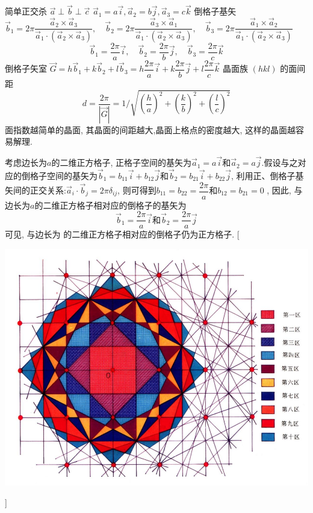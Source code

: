 \documentclass[UTF8,12pt, a4paper, oneside]{ctexart}
\begin{document}
        {简单正交杀 $\vec{a} \perp \vec{b} \perp \vec{c}$ $ \vec{a}_{1}=a\vec{i}, \vec{a}_{2}=b \vec{j}, \vec{a}_3=c\vec{k}$
        倒格子基矢 $\vec{b}_{1}=2 \pi \dfrac{\vec{a}_{2} \times \vec{a}_{3}}{\vec{a}_{1} \cdot (\vec{a}_{2} \times \vec{a}_{3})}, \quad \vec{b}_{2}=2 \pi \dfrac{\vec{a}_{3} \times \vec{a}_{1}}{\vec{a}_{1} \cdot(\vec{a}_{2} \times \vec{a}_{3})}, \quad \vec{b}_{3}=2 \pi \dfrac{\vec{a}_{1} \times \vec{a}_{2}}{\vec{a}_{1} \cdot (\vec{a}_{2} \times \vec{a}_{3})}$
        $$
        \vec{b}_{1}=\dfrac{2 \pi}{a} \vec{i}, \quad \vec{b}_{2}=\dfrac{2 \pi}{b} \vec{j}, \quad \vec{b}_{3}=\dfrac{2 \pi}{c} \vec{k}
        $$
        倒格子矢室 $\vec{G}=h \vec{b}_{1}+k \vec{b}_{2}+l \vec{b}_{3}=h \dfrac{2 \pi}{a} \vec{i}+k \dfrac{2 \pi}{b} \vec{j}+l \dfrac{2 \pi}{c} \vec{k}$ 晶面族  $(hkl)$ 的面间距
        $$
        d=\dfrac{2 \pi}{|\vec{G}|}=1 / \sqrt{(\dfrac{h}{a})^{2}+(\dfrac{k}{b})^{2}+(\dfrac{l}{c})^{2}}
        $$ 面指数越简单的晶面, 其晶面的间距越大,晶面上格点的密度越大, 这样的晶面越容易解理.}

    {考虑边长为$a$的二维正方格子, 正格子空间的基矢为$\vec{a}_1=a\vec{i}$和$\vec{a}_2=a\vec{j}$.假设与之对应的倒格子空间的基矢为$\vec{b}_1=b_{11}\vec{i}+b_{12}\vec{j}$和$\vec{b}_2=b_{21}\vec{i}+b_{22}\vec{j}$, 利用正、倒格子基矢间的正交关系:$\vec{a}_i \cdot \vec{b}_j =2 \pi \delta_{ij}$, 则可得到$b_{11}=b_{22}=\dfrac{2 \pi}{a}$和$b_{12}=b_{21}=0$ , 因此, 与边长为$a$的二维正方格子相对应的倒格子的基矢为\[\vec{b}_1=\dfrac{2 \pi}{a}\vec{i} \text{和} \vec{b}_2=\dfrac{2 \pi}{a}\vec{j}\]
     可见, 与边长为  的二维正方格子相对应的倒格子仍为正方格子.}
     [\begin{center}
        \includegraphics{picture/3-10 .png}
    \end{center}]
\end{document}
